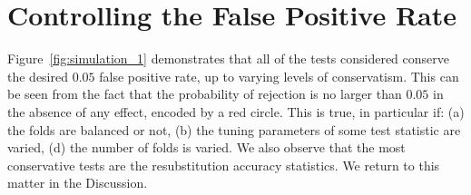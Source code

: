 \documentclass[12pt,a4paper]{article}
\theoremstyle{definition}
\begin{document}
\section{Controlling the False Positive Rate}
\label{sec:type_i}

Figure~\ref{fig:simulation_1} demonstrates that all of the tests considered conserve the desired $0.05$ false positive rate, up to varying levels of conservatism.
This can be seen from the fact that the probability of rejection is no larger than $0.05$ in the absence of any effect, encoded by a red circle. 
This is true, in particular if:
(a) the folds are balanced or not,
(b) the tuning parameters of some test statistic are varied,
(d) the number of folds is varied.
We also observe that the most conservative tests are the resubstitution accuracy statistics. 
We return to this matter in the Discussion.
\end{document}
